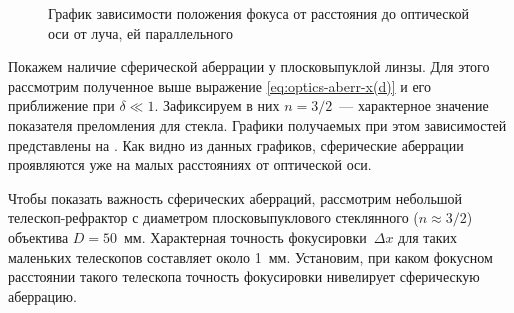 \begin{figure}
    \centering
    \vspace{-.5pc}
    \caption{График зависимости положения фокуса от расстояния до оптической оси от луча, ей параллельного}
    \label{pic:sphere-aberrations-lens-plot}
\end{figure}
Покажем наличие сферической аберрации у плосковыпуклой линзы. Для этого рассмотрим полученное выше выражение \eqref{eq:optics-aberr-x(d)} и его приближение при $\delta \ll 1$. Зафиксируем в них $n=3/2$~--- характерное значение показателя преломления для стекла. Графики получаемых при этом зависимостей представлены на . Как видно из данных графиков, сферические аберрации проявляются уже на малых расстояниях от оптической оси.

Чтобы показать важность сферических аберраций, рассмотрим небольшой телескоп-рефрактор с диаметром плос\-ко\-вы\-пук\-ло\-во\-го стеклянного ($n \approx 3/2$) объектива $D = 50$~мм. Характерная точность фокусировки~$\Delta x$ для таких маленьких телескопов составляет около 1~мм. Установим, при каком фокусном расстоянии такого телескопа точность фокусировки нивелирует сферическую аберрацию.

